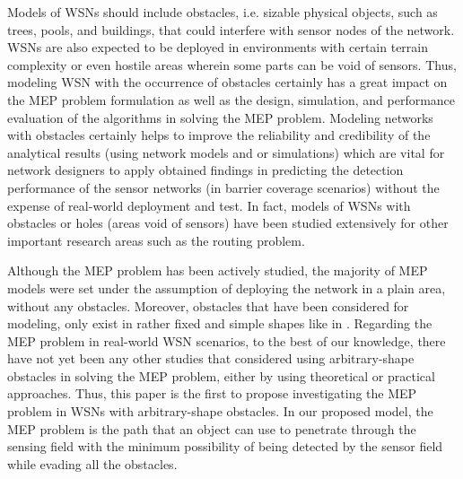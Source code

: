 \documentclass[final]{elsarticle}
\begin{document}
Models of WSNs should include obstacles, i.e. sizable physical objects, such as trees, pools, and buildings, that could interfere with sensor nodes of the network. WSNs are also expected to be deployed in environments with certain terrain complexity or even hostile areas wherein some parts can be void of sensors. Thus, modeling WSN with the occurrence of obstacles certainly has a great impact on the MEP problem formulation as well as the design, simulation, and performance evaluation of the algorithms in solving the MEP problem. Modeling networks with obstacles certainly helps to improve the reliability and credibility of the analytical results (using network models and or simulations) which are vital for network designers to apply obtained findings in predicting the detection performance of the sensor networks (in barrier coverage scenarios) without the expense of real-world deployment and test. In fact, models of WSNs with obstacles or holes (areas void of sensors) have been studied extensively for other important research areas such as the routing problem.

Although the MEP problem has been actively studied, the majority of MEP models were set under the assumption of deploying the network in a plain area, without any obstacles. Moreover, obstacles that have been considered for modeling, only exist in rather fixed and simple shapes like in \cite{liu2017obstacle}. Regarding the MEP problem in real-world WSN scenarios, to the best of our knowledge, there have not yet been any other studies that considered using arbitrary-shape obstacles in solving the MEP problem, either by using theoretical or practical approaches. Thus, this paper is the first to propose investigating the MEP problem in WSNs with arbitrary-shape obstacles. In our proposed model, the MEP problem is the path that an object can use to penetrate through the sensing field with the minimum possibility of being detected by the sensor field while evading all the obstacles. 
\end{document}
